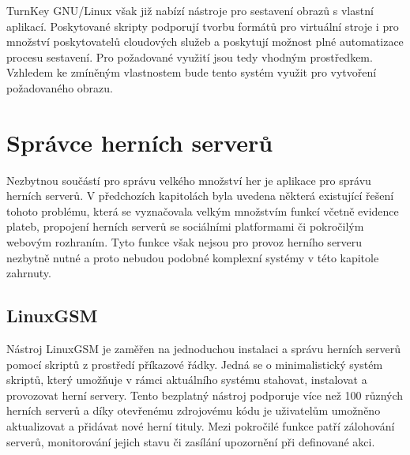 TurnKey GNU/Linux však již nabízí nástroje pro sestavení obrazů s vlastní aplikací. Poskytované skripty podporují tvorbu formátů
pro virtuální stroje i pro množství poskytovatelů cloudových služeb a poskytují možnost plné automatizace procesu sestavení.
Pro požadované využití jsou tedy vhodným prostředkem. Vzhledem ke zmíněným vlastnostem bude tento systém využit pro vytvoření
požadovaného obrazu.

\section{Správce herních serverů}

Nezbytnou součástí pro správu velkého množství her je aplikace pro správu herních serverů. V předchozích kapitolách
byla uvedena některá existující řešení tohoto problému, která se vyznačovala velkým množstvím funkcí včetně
evidence plateb, propojení herních serverů se sociálními platformami či pokročilým webovým rozhraním.
Tyto funkce však nejsou pro provoz herního serveru nezbytně nutné a proto nebudou podobné komplexní systémy v této kapitole zahrnuty.

\subsection{LinuxGSM}

Nástroj LinuxGSM \cite{linuxgsm} je zaměřen na jednoduchou instalaci a správu herních serverů pomocí skriptů z prostředí příkazové řádky.
Jedná se o minimalistický systém skriptů, který umožňuje v rámci aktuálního systému stahovat, instalovat a provozovat herní servery.
Tento bezplatný nástroj podporuje více než 100 různých herních serverů a díky otevřenému zdrojovému kódu je uživatelům umožněno aktualizovat
a přidávat nové herní tituly. Mezi pokročilé funkce patří zálohování serverů, monitorování jejich stavu či zasílání upozornění při definované akci.